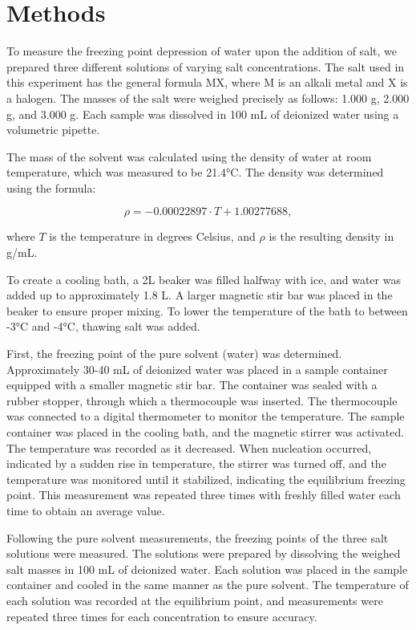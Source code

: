 \documentclass[a4paper,12pt]{article}
\begin{document}
\section{Methods}
To measure the freezing point depression of water upon the addition of salt, we prepared three different solutions of varying salt concentrations. The salt used in this experiment has the general formula MX, where M is an alkali metal and X is a halogen. The masses of the salt were weighed precisely as follows: 1.000 g, 2.000 g, and 3.000 g. Each sample was dissolved in 100 mL of deionized water using a volumetric pipette.

The mass of the solvent was calculated using the density of water at room temperature, which was measured to be 21.4°C. The density was determined using the formula:

\begin{equation}
\rho = -0.00022897 \cdot T + 1.00277688,
\end{equation}

where $T$ is the temperature in degrees Celsius, and $\rho$ is the resulting density in g/mL.

To create a cooling bath, a 2L beaker was filled halfway with ice, and water was added up to approximately 1.8 L. A larger magnetic stir bar was placed in the beaker to ensure proper mixing. To lower the temperature of the bath to between -3°C and -4°C, thawing salt was added.

First, the freezing point of the pure solvent (water) was determined. Approximately 30-40 mL of deionized water was placed in a sample container equipped with a smaller magnetic stir bar. The container was sealed with a rubber stopper, through which a thermocouple was inserted. The thermocouple was connected to a digital thermometer to monitor the temperature. The sample container was placed in the cooling bath, and the magnetic stirrer was activated. The temperature was recorded as it decreased. When nucleation occurred, indicated by a sudden rise in temperature, the stirrer was turned off, and the temperature was monitored until it stabilized, indicating the equilibrium freezing point. This measurement was repeated three times with freshly filled water each time to obtain an average value.

Following the pure solvent measurements, the freezing points of the three salt solutions were measured. The solutions were prepared by dissolving the weighed salt masses in 100 mL of deionized water. Each solution was placed in the sample container and cooled in the same manner as the pure solvent. The temperature of each solution was recorded at the equilibrium point, and measurements were repeated three times for each concentration to ensure accuracy.
\end{document}
